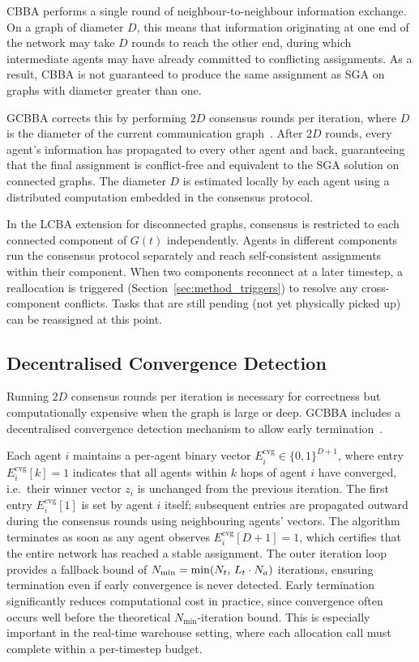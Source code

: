 CBBA performs a single round of neighbour-to-neighbour information exchange.
On a graph of diameter $D$, this means that information originating at one end
of the network may take $D$ rounds to reach the other end, during which
intermediate agents may have already committed to conflicting assignments.
As a result, CBBA is not guaranteed to produce the same assignment as SGA on
graphs with diameter greater than one.

GCBBA corrects this by performing $2D$ consensus rounds per iteration, where
$D$ is the diameter of the current communication graph~\cite{kha2025enhancing}.
After $2D$ rounds, every agent's information has propagated to every other agent
and back, guaranteeing that the final assignment is conflict-free and equivalent
to the SGA solution on connected graphs.
The diameter $D$ is estimated locally by each agent using a distributed
computation embedded in the consensus protocol.

In the LCBA extension for disconnected graphs, consensus is restricted to each
connected component of $G(t)$ independently.
Agents in different components run the consensus protocol separately and reach
self-consistent assignments within their component.
When two components reconnect at a later timestep, a reallocation is triggered
(Section~\ref{sec:method_triggers}) to resolve any cross-component conflicts.
Tasks that are still pending (not yet physically picked up) can be reassigned
at this point.


\subsection{Decentralised Convergence Detection}
\label{subsec:method_convergence}

Running $2D$ consensus rounds per iteration is necessary for correctness but
computationally expensive when the graph is large or deep.
GCBBA includes a decentralised convergence detection mechanism to allow early
termination~\cite{kha2025enhancing}.

Each agent $i$ maintains a per-agent binary vector
$E^{\text{cvg}}_i \in \{0,1\}^{D+1}$, where entry $E^{\text{cvg}}_i[k] = 1$
indicates that all agents within $k$ hops of agent $i$ have converged,
i.e.\ their winner vector $z_i$ is unchanged from the previous iteration.
The first entry $E^{\text{cvg}}_i[1]$ is set by agent $i$ itself; subsequent
entries are propagated outward during the consensus rounds using neighbouring
agents' vectors.
The algorithm terminates as soon as any agent observes
$E^{\text{cvg}}_i[D+1] = 1$, which certifies that the entire network has
reached a stable assignment.
The outer iteration loop provides a fallback bound of $N_{\min} = \min(N_t,\,L_t\cdot N_a)$
iterations, ensuring termination even if early convergence is never detected.
Early termination significantly reduces computational cost in practice, since
convergence often occurs well before the theoretical $N_{\min}$-iteration bound.
This is especially important in the real-time warehouse setting, where each
allocation call must complete within a per-timestep budget.


